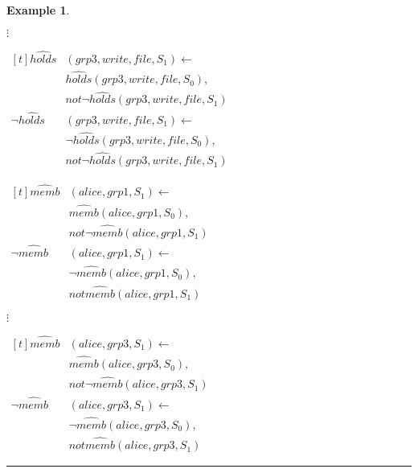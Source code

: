 \documentclass[10pt, twocolumn]{article}
\newtheorem{examp}{Example}
\newenvironment{example}{\begin{examp}\rm}{\rule{2mm}{2mm}\end{examp}}
\begin{document}
\begin{example}
\begin{enumerate}
              \hspace{1cm} $\vdots$

              \begin{math}
                \begin{aligned}[t]
                  \hat{holds}&(grp3, write, file, S_{1}) \leftarrow \\
                  & \hat{holds}(grp3, write, file, S_{0}), \\
                  & not \lnot \hat{holds}(grp3, write, file, S_{1}) \\
                  \lnot \hat{holds}&(grp3, write, file, S_{1}) \leftarrow \\
                  & \lnot \hat{holds}(grp3, write, file, S_{0}), \\
                  & not \lnot \hat{holds}(grp3, write, file, S_{1})
                \end{aligned}
              \end{math}

              \begin{math}
                \begin{aligned}[t]
                  \hat{memb}&(alice, grp1, S_{1}) \leftarrow \\
                  & \hat{memb}(alice, grp1, S_{0}), \\
                  & not \lnot \hat{memb}(alice, grp1, S_{1}) \\
                  \lnot \hat{memb}&(alice, grp1, S_{1}) \leftarrow \\
                  & \lnot \hat{memb}(alice, grp1, S_{0}), \\
                  & not \hat{memb}(alice, grp1, S_{1})
                \end{aligned}
              \end{math}

              \hspace{1cm} $\vdots$

              \begin{math}
                \begin{aligned}[t]
                  \hat{memb}&(alice, grp3, S_{1}) \leftarrow \\
                  & \hat{memb}(alice, grp3, S_{0}), \\
                  & not \lnot \hat{memb}(alice, grp3, S_{1}) \\
                  \lnot \hat{memb}&(alice, grp3, S_{1}) \leftarrow \\
                  & \lnot \hat{memb}(alice, grp3, S_{0}), \\
                  & not \hat{memb}(alice, grp3, S_{1})
                \end{aligned}
              \end{math}


\end{enumerate}
\end{example}
\end{document}
